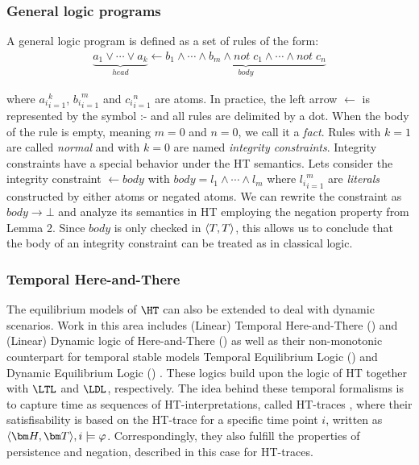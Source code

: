 \subsubsection{General logic programs}

A general logic program is defined as a set of rules of the form:
\begin{align*}
    \underbrace{a_1 \vee \cdots \vee a_k}_{\mathit{head}} \leftarrow \underbrace{b_{1} \wedge \cdots \wedge b_{m} \wedge \mathit{not}\; c_{1} \wedge \cdots \wedge \mathit{not}\; c_{n}}_{\mathit{body}} 
\end{align*}

\begin{flushleft}
where ${a_i}_{i=1}^k$, ${b_i}_{i=1}^m$ and ${c_i}_{i=1}^n$ are atoms. In practice, the left arrow $\leftarrow$ is represented by the symbol $\texttt{:-}$ and all rules are delimited by a dot. When the body of the rule is empty, meaning $m=0$ and $n=0$, we call it a \emph{fact}. Rules with $k=1$ are called \emph{normal} and with $k=0$ are named \emph{integrity constraints}. 
Integrity constraints have a special behavior under the HT semantics. 
Lets consider the integrity constraint $\leftarrow \mathit{body}$ with $\mathit{body}=l_1 \wedge \cdots \wedge l_m$ where ${l_i}_{i=1}^m$ are \emph{literals} constructed by either atoms or negated atoms. We can rewrite the constraint as $\mathit{body} \to \bot$ and analyze its semantics in HT employing the negation property from Lemma 2. Since $\mathit{body}$ is only checked in $\langle T,T \rangle$, this allows us to conclude that the body of an integrity constraint can be treated as in classical logic. 
\end{flushleft}

\subsubsection{Temporal Here-and-There}


The equilibrium models of $\HT$ can also be extended to deal with dynamic scenarios. Work in this area includes (Linear) Temporal Here-and-There (\THT) \cite{agcadipevi13a} and (Linear) Dynamic logic of Here-and-There (\DHT) \cite{bocadisc18a} as well as their non-monotonic counterpart for temporal stable models Temporal Equilibrium Logic (\TEL) \cite{agcadipevi13a} and Dynamic Equilibrium Logic (\DEL) \cite{cadisc19a}. These logics build upon the logic of HT together with $\LTL$ \cite{pnueli77a} and $\LDL$\cite{giavar13a}, respectively. The idea behind these temporal formalisms is to capture time as sequences of HT-interpretations, called HT-traces \thandt, where their satisfisability is based on the HT-trace for a specific time point $i$, written as $\thandt, i\models \varphi$. Correspondingly, they also fulfill the properties of persistence and negation, described in this case for HT-traces.

